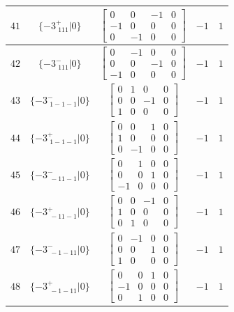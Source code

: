 \documentclass[fleqn,8pt]{jsarticle}
\begin{document}
\begin{longtable}{ccccc}
$ 41 $ & $ \{-3^{+}_{\,\,111}|0\} $ & $ \begin{bmatrix} 0 & 0 & -1 & 0 \\ -1 & 0 & 0 & 0 \\ 0 & -1 & 0 & 0 \end{bmatrix} $ & $ -1 $ & $ 1 $ \\ \hline
$ 42 $ & $ \{-3^{-}_{\,\,111}|0\} $ & $ \begin{bmatrix} 0 & -1 & 0 & 0 \\ 0 & 0 & -1 & 0 \\ -1 & 0 & 0 & 0 \end{bmatrix} $ & $ -1 $ & $ 1 $ \\ \hline
$ 43 $ & $ \{-3^{-}_{\,\,1-1-1}|0\} $ & $ \begin{bmatrix} 0 & 1 & 0 & 0 \\ 0 & 0 & -1 & 0 \\ 1 & 0 & 0 & 0 \end{bmatrix} $ & $ -1 $ & $ 1 $ \\ \hline
$ 44 $ & $ \{-3^{+}_{\,\,1-1-1}|0\} $ & $ \begin{bmatrix} 0 & 0 & 1 & 0 \\ 1 & 0 & 0 & 0 \\ 0 & -1 & 0 & 0 \end{bmatrix} $ & $ -1 $ & $ 1 $ \\ \hline
$ 45 $ & $ \{-3^{-}_{\,\,-11-1}|0\} $ & $ \begin{bmatrix} 0 & 1 & 0 & 0 \\ 0 & 0 & 1 & 0 \\ -1 & 0 & 0 & 0 \end{bmatrix} $ & $ -1 $ & $ 1 $ \\ \hline
$ 46 $ & $ \{-3^{+}_{\,\,-11-1}|0\} $ & $ \begin{bmatrix} 0 & 0 & -1 & 0 \\ 1 & 0 & 0 & 0 \\ 0 & 1 & 0 & 0 \end{bmatrix} $ & $ -1 $ & $ 1 $ \\ \hline
$ 47 $ & $ \{-3^{-}_{\,\,-1-11}|0\} $ & $ \begin{bmatrix} 0 & -1 & 0 & 0 \\ 0 & 0 & 1 & 0 \\ 1 & 0 & 0 & 0 \end{bmatrix} $ & $ -1 $ & $ 1 $ \\ \hline
$ 48 $ & $ \{-3^{+}_{\,\,-1-11}|0\} $ & $ \begin{bmatrix} 0 & 0 & 1 & 0 \\ -1 & 0 & 0 & 0 \\ 0 & 1 & 0 & 0 \end{bmatrix} $ & $ -1 $ & $ 1 $ \\ \hline

\end{longtable}
\end{document}
